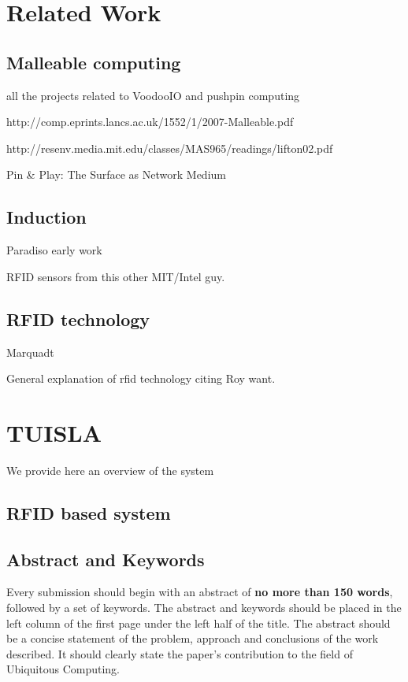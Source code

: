 \documentclass{ubicomp2013}
\begin{document}
\section{Related Work}


\subsection{Malleable computing}
all the projects related to VoodooIO and pushpin computing

http://comp.eprints.lancs.ac.uk/1552/1/2007-Malleable.pdf

http://resenv.media.mit.edu/classes/MAS965/readings/lifton02.pdf

Pin \& Play: The Surface as Network Medium

\subsection{Induction}
Paradiso early work

RFID sensors from this other MIT/Intel guy.

\subsection{RFID technology}
Marquadt

General explanation of rfid technology citing Roy want.


\section{TUISLA}

We provide here an overview of the system

\subsection{RFID based system}


\subsection{Abstract and Keywords}

Every submission should begin with an abstract of \textbf{no more than 150 words},
followed by a set of keywords. The abstract and keywords should be
placed in the left column of the first page under the left half of the
title. The abstract should be a concise statement of the problem,
approach and conclusions of the work described.  It should clearly
state the paper's contribution to the field of Ubiquitous Computing.
\end{document}
